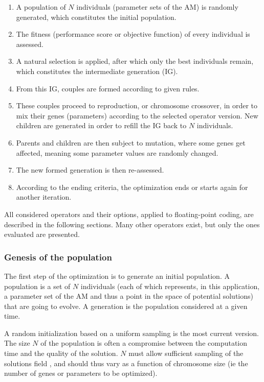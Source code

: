 \documentclass{ametsoc}
\begin{document}
\begin{enumerate}
	\item A population of $N$ individuals (parameter sets of the AM) is randomly generated, which constitutes the initial population.
	\item The fitness (performance score or objective function) of every individual is assessed.
	\item A natural selection is applied, after which only the best individuals remain, which constitutes the intermediate generation (IG).
	\item From this IG, couples are formed according to given rules.
	\item These couples proceed to reproduction, or chromosome crossover, in order to mix their genes (parameters) according to the selected operator version. New children are generated in order to refill the IG back to $N$ individuals.
	\item Parents and children are then subject to mutation, where some genes get affected, meaning some parameter values are randomly changed.
	\item The new formed generation is then re-assessed.
	\item According to the ending criteria, the optimization ends or starts again for another iteration.
\end{enumerate}

All considered operators and their options, applied to floating-point coding, are described in the following sections. Many other operators exist, but only the ones evaluated are presented.

\subsubsection{Genesis of the population}

The first step of the optimization is to generate an initial population. A population is a set of $N$ individuals (each of which represents, in this application, a parameter set of the AM and thus a point in the space of potential solutions) that are going to evolve. A generation is the population considered at a given time. 

A random initialization based on a uniform sampling is the most current version. The size $N$ of the population is often a compromise between the computation time and the quality of the solution. $N$ must allow sufficient sampling of the solutions field \citep{Beasley1996a}, and should thus vary as a function of chromosome size (ie the number of genes or parameters to be optimized). 
\end{document}
